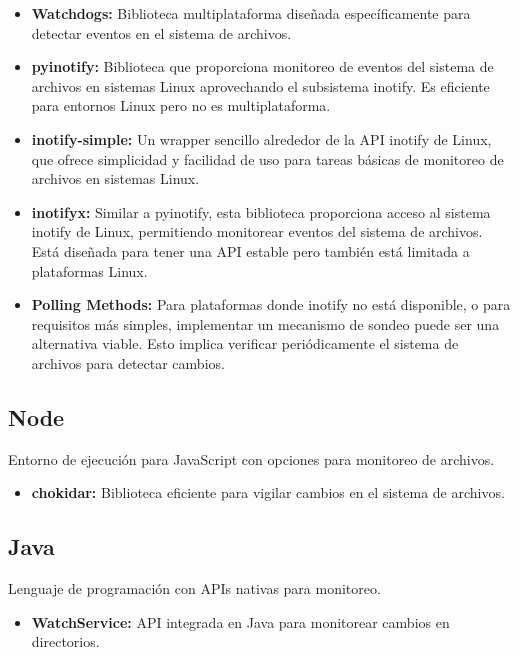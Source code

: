 \begin{itemize}
    \item \textbf{Watchdogs:} Biblioteca multiplataforma diseñada específicamente para detectar eventos en el sistema de archivos.
    
    \item \textbf{pyinotify:} Biblioteca que proporciona monitoreo de eventos del sistema de archivos en sistemas Linux aprovechando el subsistema inotify. Es eficiente para entornos Linux pero no es multiplataforma.
    
    \item \textbf{inotify-simple:} Un wrapper sencillo alrededor de la API inotify de Linux, que ofrece simplicidad y facilidad de uso para tareas básicas de monitoreo de archivos en sistemas Linux.
    
    \item \textbf{inotifyx:} Similar a pyinotify, esta biblioteca proporciona acceso al sistema inotify de Linux, permitiendo monitorear eventos del sistema de archivos. Está diseñada para tener una API estable pero también está limitada a plataformas Linux.
    
    \item \textbf{Polling Methods:} Para plataformas donde inotify no está disponible, o para requisitos más simples, implementar un mecanismo de sondeo puede ser una alternativa viable. Esto implica verificar periódicamente el sistema de archivos para detectar cambios.
\end{itemize}

\subsection{Node}
Entorno de ejecución para JavaScript con opciones para monitoreo de archivos.

\begin{itemize}
    \item \textbf{chokidar:} Biblioteca eficiente para vigilar cambios en el sistema de archivos.
\end{itemize}

\subsection{Java}
Lenguaje de programación con APIs nativas para monitoreo.

\begin{itemize}
    \item \textbf{WatchService:} API integrada en Java para monitorear cambios en directorios.
\end{itemize}

